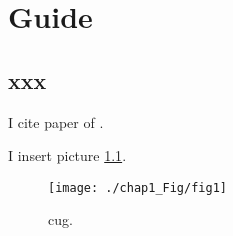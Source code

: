 \chapter{Guide}\label{chap:guide}

\section{xxx}
I cite paper of \citet{claerbout1968synthesis}.

I insert picture \ref{fig:chap1-fig1}.



\begin{figure}[!htbp]
    \centering
    \texttt{[image: ./chap1\_Fig/fig1]}
    \caption{cug.}
    \label{fig:chap1-fig1}
\end{figure}





